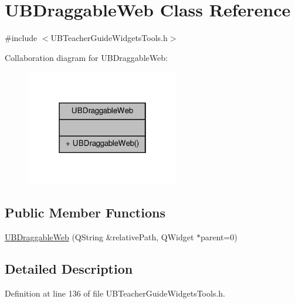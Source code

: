 \hypertarget{class_u_b_draggable_web}{\section{U\-B\-Draggable\-Web Class Reference}
\label{d3/d9a/class_u_b_draggable_web}
}


{\ttfamily \#include $<$U\-B\-Teacher\-Guide\-Widgets\-Tools.\-h$>$}



Collaboration diagram for U\-B\-Draggable\-Web\-:
\nopagebreak
\begin{figure}[H]
\begin{center}
\leavevmode
\includegraphics[width=190pt]{dd/dc1/class_u_b_draggable_web__coll__graph}
\end{center}
\end{figure}
\subsection*{Public Member Functions}
\begin{DoxyCompactItemize}
\item 
\hyperlink{class_u_b_draggable_web_a921973cd333546c670f0b035ef5ca1bd}{U\-B\-Draggable\-Web} (Q\-String \&relative\-Path, Q\-Widget $\ast$parent=0)
\end{DoxyCompactItemize}


\subsection{Detailed Description}


Definition at line 136 of file U\-B\-Teacher\-Guide\-Widgets\-Tools.\-h.



